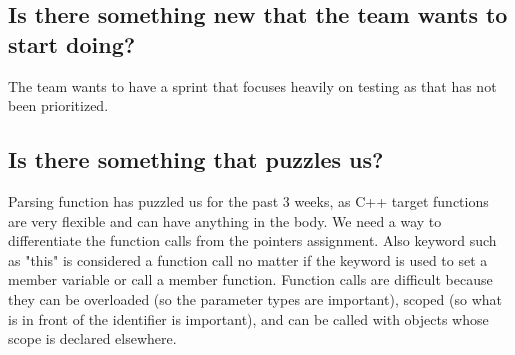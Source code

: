 \subsection*{Is there something new that the team wants to start doing?}
The team wants to have a sprint that focuses heavily on testing as that has not been prioritized. 

\subsection*{Is there something that puzzles us?}
\label{appendix:retrospective2019-03-18}
Parsing function has puzzled us for the past 3 weeks, as C++ target functions are very flexible and can have anything in the body. We need a way to differentiate the function calls from the pointers assignment. Also keyword such as "this" is considered a function call no matter if the keyword is used to set a member variable or call a member function.
Function calls are difficult because they can be overloaded (so the parameter types are important), scoped (so what is in front of the identifier is important), and can be called with objects whose scope is declared elsewhere. 
\newpage
